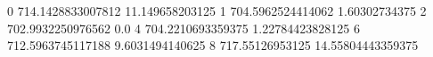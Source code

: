 0 714.1428833007812 11.149658203125
1 704.5962524414062 1.60302734375
2 702.9932250976562 0.0
4 704.2210693359375 1.22784423828125
6 712.5963745117188 9.6031494140625
8 717.55126953125 14.55804443359375
